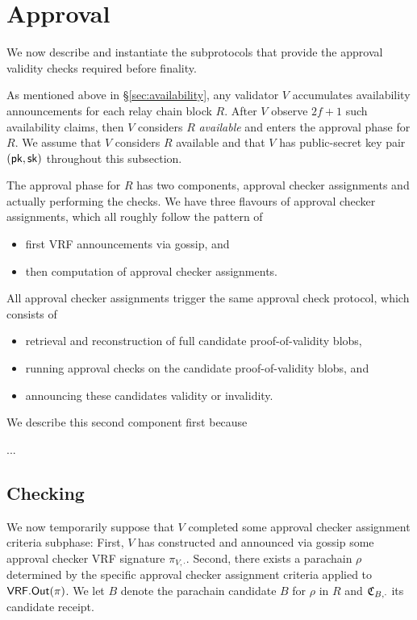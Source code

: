 

\section{Approval} %
\label{sec:approval}

We now describe and instantiate the subprotocols that provide the approval validity checks required before finality.

As mentioned above in \S\ref{sec:availability}, any validator $V$ accumulates availability announcements for each relay chain block $R$.  After $V$ observe $2f+1$ such availability claims, then $V$ considers $R$ {\em available} and enters the approval phase for $R$.  We assume that $V$ considers $R$ available and that $V$ has public-secret key pair $(\mathsf{pk},\mathsf{sk})$ throughout this subsection.

The approval phase for $R$ has two components, approval checker assignments and actually performing the checks.  We have three flavours of approval checker assignments, which all roughly follow the pattern of
\begin{itemize}
\item first VRF announcements via gossip, and
\item then computation of approval checker assignments.
\end{itemize}
\noindent 
All approval checker assignments trigger the same approval check protocol, which consists of
\begin{itemize}
\item retrieval and reconstruction of full candidate proof-of-validity blobs, 
\item running approval checks on the candidate proof-of-validity blobs, and 
\item announcing these candidates validity or invalidity.
\end{itemize}
We describe this second component first because 

...


\subsection{Checking}
\label{sec:approcal_checks}

We now temporarily suppose that $V$ completed some approval checker assignment criteria subphase:  First, $V$ has constructed and announced via gossip some approval checker VRF signature $\pi_{V,\cdot}$.  Second, there exists a parachain $\rho$ determined by the specific approval checker assignment criteria applied to $\mathsf{VRF}.\mathsf{Out}(\pi)$.  We let $B$ denote the parachain candidate $B$ for $\rho$ in $R$ and $\mathfrak{C}_{B,\cdot}$ its candidate receipt.  

